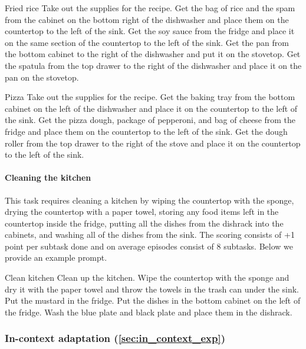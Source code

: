 \begin{PromptBox}{Fried rice}
Take out the supplies for the recipe. Get the bag of rice and the spam from the cabinet on the bottom right of the dishwasher and place them on the countertop to the left of the sink. Get the soy sauce from the fridge and place it on the same section of the countertop to the left of the sink. Get the pan from the bottom cabinet to the right of the dishwasher and put it on the stovetop. Get the spatula from the top drawer to the right of the dishwasher and place it on the pan on the stovetop.
\end{PromptBox}

\begin{PromptBox}{Pizza}
Take out the supplies for the recipe. Get the baking tray from the bottom cabinet on the left of the dishwasher and place it on the countertop to the left of the sink. Get the pizza dough, package of pepperoni, and bag of cheese from the fridge and place them on the countertop to the left of the sink. Get the dough roller from the top drawer to the right of the stove and place it on the countertop to the left of the sink.
\end{PromptBox}
 

\paragraph{Cleaning the kitchen} This task requires cleaning a kitchen by wiping the countertop with the sponge, drying the countertop with a paper towel, storing any food items left in the countertop inside the fridge, putting all the dishes from the dishrack into the cabinets, and washing all of the dishes from the sink. The scoring consists of +1 point per subtask done and on average episodes consist of 8 subtasks. Below we provide an example prompt.
\begin{PromptBox}{Clean kitchen}
Clean up the kitchen. Wipe the countertop with the sponge and dry it with the paper towel and throw the towels in the trash can under the sink. Put the mustard in the fridge. Put the dishes in the bottom cabinet on the left of the fridge. Wash the blue plate and black plate and place them in the dishrack. 
\end{PromptBox}


\subsubsection{In-context adaptation (\cref{sec:in_context_exp})}

